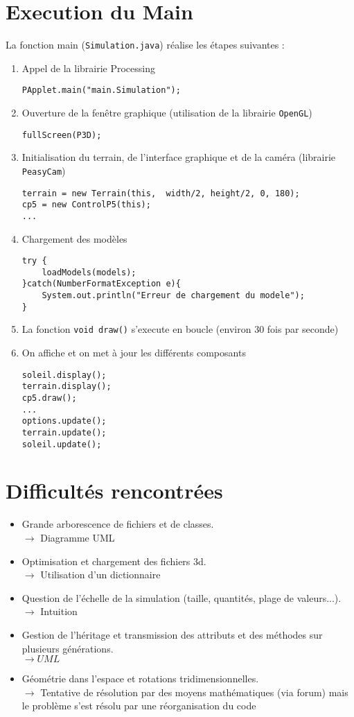 \documentclass[11pt,a4paper]{article}
\begin{document}
\part{Execution du Main}
La fonction main (\texttt{Simulation.java}) réalise les étapes suivantes : \break
\begin{enumerate}
\item{Appel de la librairie Processing}
\begin{lstlisting}
PApplet.main("main.Simulation");
\end{lstlisting}
\item{Ouverture de la fenêtre graphique (utilisation de la librairie \texttt{OpenGL})}
\begin{lstlisting}
fullScreen(P3D);
\end{lstlisting}
\item{Initialisation du terrain, de l'interface graphique et de la caméra (librairie \texttt{PeasyCam})}
\begin{lstlisting}
terrain = new Terrain(this,  width/2, height/2, 0, 180);
cp5 = new ControlP5(this);
...
\end{lstlisting}
\item{Chargement des modèles}
\begin{lstlisting}
try {
	loadModels(models);
}catch(NumberFormatException e){
	System.out.println("Erreur de chargement du modele");
}
\end{lstlisting}
\newpage
\item{La fonction \texttt{void draw()} s'execute en boucle (environ 30 fois par seconde)}
\item{On affiche et on met à jour les différents composants}
\begin{lstlisting}
soleil.display();
terrain.display();
cp5.draw();
...
options.update();
terrain.update();
soleil.update();
\end{lstlisting}
\end{enumerate}

\part{Difficultés rencontrées}
\begin{itemize}
\item Grande arborescence de fichiers et de classes.
\\$\rightarrow$ Diagramme UML
\item Optimisation et chargement des fichiers 3d.
\\$\rightarrow$ Utilisation d'un dictionnaire
\item Question de l'échelle de la simulation (taille, quantités, plage de valeurs...).
\\$\rightarrow$ Intuition
\item Gestion de l'héritage et transmission des attributs et des méthodes sur plusieurs générations.
\\$\rightarrow UML$
\item Géométrie dans l'espace et rotations tridimensionnelles.
\\$\rightarrow$ Tentative de résolution par des moyens mathématiques (via forum) mais le problème s'est résolu par une réorganisation du code
\end{itemize}
\end{document}
